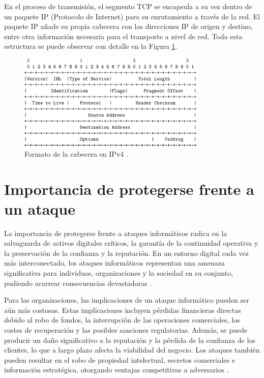 En el proceso de transmisión, el segmento TCP se encapsula a su vez dentro de un paquete IP (Protocolo de Internet) para su enrutamiento a través de la red. El paquete IP añade su propia cabecera con las direcciones IP de origen y destino, entre otra información necesaria para el transporte a nivel de red. Toda esta estructura se puede observar con detalle en la Figura \ref{fig:PaqueteIP}.

\begin{figure}[H]
    \centering
    \includegraphics[width=0.8\textwidth]{./img/ent-problema/PaqueteIP.png}
    \caption{Formato de la cabecera en IPv4 \cite{paqueteip}.}
    \label{fig:PaqueteIP}
\end{figure}

\section{Importancia de protegerse frente a un ataque}

La importancia de protegerse frente a ataques informáticos radica en la salvaguarda de activos digitales críticos, la garantía de la continuidad operativa y la preservación de la confianza y la reputación. En un entorno digital cada vez más interconectado, los ataques informáticos representan una amenaza significativa para individuos, organizaciones y la sociedad en su conjunto, pudiendo acarrear consecuencias devastadoras \cite{Santos2020}.

Para las organizaciones, las implicaciones de un ataque informático pueden ser aún más costosas. Estas implicaciones incluyen pérdidas financieras directas debido al robo de fondos, la interrupción de las operaciones comerciales, los costes de recuperación y las posibles sanciones regulatorias. Además, se puede producir un daño significativo a la reputación y la pérdida de la confianza de los clientes, lo que a largo plazo afecta la viabilidad del negocio. Los ataques también pueden resultar en el robo de propiedad intelectual, secretos comerciales e información estratégica, otorgando ventajas competitivas a adversarios \cite{Ponemon2019}. 

